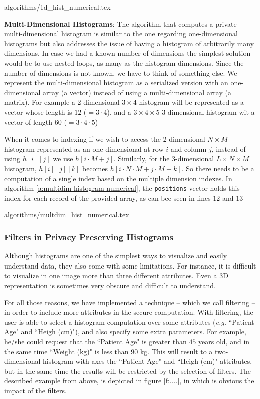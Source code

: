 {algorithms/1d_hist_numerical.tex}



\textbf{Multi-Dimensional Histograms}:
The algorithm that computes a private multi-dimensional histogram is similar to the one regarding one-dimensional histograms but also addresses the issue of having a histogram of arbitrarily many dimensions.
In case we had a known number of dimensions the simplest solution would be to use nested loops, as many as the histogram dimensions.
Since the number of dimensions is not known, we have to think of something else.
We represent the multi-dimensional histogram as a serialized version with an one-dimensional array (a vector) instead of using a multi-dimensional array (a matrix).
For example a 2-dimensional $3 \times 4$ histogram will be represented as a vector whose length is $ 12 $ ($= 3 \cdot 4$), and a $3 \times 4 \times 5$ 3-dimensional histogram wit a vector of length $ 60 $ ($= 3 \cdot 4 \cdot 5$)

When it comes to indexing if we wish to access the 2-dimensional $N \times M$ histogram represented as an one-dimensional at row $ i $ and column $ j $, instead of using $h[i][j]$ we use $h[i \cdot M + j]$.
Similarly, for the 3-dimensional $L \times N \times M$ histogram, $h[i][j][k]$ becomes $h[i \cdot N \cdot M + j \cdot M + k]$. So there needs to be a computation of a single index based on the multiple dimension indexes. In algorithm \ref{a:multidim-histogram-numerical}, the \texttt{positions} vector holds this index for each record of the provided array, as can bee seen in lines $ 12 $ and $ 13 $

{algorithms/multdim_hist_numerical.tex}



\subsubsection{Filters in Privacy Preserving Histograms}\label{sss:histogram-filters}
Although histograms are one of the simplest ways to visualize and easily understand data, they also come with some limitations.
For instance, it is difficult to visualize in one image more than three different attributes.
Even a 3D representation is sometimes very obscure and difficult to understand.

For all those reasons, we have implemented a technique -- which we call filtering -- in order to include more attributes in the secure computation.
With filtering, the user is able to select a histogram computation over some attributes (\textit{e.g.} ``Patient Age" and ``Heigh (cm)"), and also specify some extra parameters.
For example, he/she could request that the ``Patient Age" is greater than $45$ years old, and in the same time ``Weight (kg)" is less than $90$ kg.
This will result to a two-dimensional histogram with axes the ``Patient Age" and ``Heigh (cm)" attributes, but in the same time the results will be restricted by the selection of filters.
The described example from above, is depicted in figure \ref{f:....}, in which is obvious the impact of the filters.

